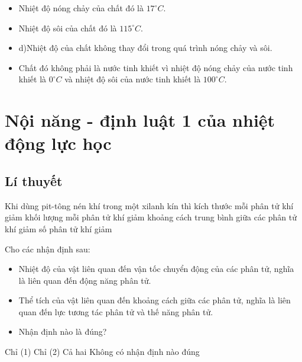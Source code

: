 \begin{ex}
{\begin{itemize}
			\item Nhiệt độ nóng chảy của chất đó là $17^{\circ} C$.
			\item Nhiệt độ sôi của chất đó là $115^{\circ} C$.
			\item d)Nhiệt độ của chất không thay đổi trong quá trình nóng chảy và sôi.
			\item Chất đó không phải là nước tinh khiết vì nhiệt độ nóng chảy của nước tinh khiết là $0^{\circ} C$ và nhiệt độ sôi của nước tinh khiết là $100^{\circ} C$.
		\end{itemize} 
	}
\end{ex}
\section{Nội năng - định luật 1 của nhiệt động lực học}
\subsection{Lí thuyết}


\begin{ex}
	Khi dùng pit-tông nén khí trong một xilanh kín thì
	\choice
	{kích thước mỗi phân tử khí giảm}
	{khối lượng mỗi phân tử khí giảm}
	{\True khoảng cách trung bình giữa các phân tử khí giảm}
	{số phân tử khí giảm}
	\end{ex}







\begin{ex}
	Cho các nhận định sau:
	\begin{itemize}
		\item[(1)] Nhiệt độ của vật liên quan đến vận tốc chuyển động của các phân tử, nghĩa là liên quan đến động năng phân tử.
		\item [(2)] Thể tích của vật liên quan đến khoảng cách giữa các phân tử, nghĩa là liên quan đến lực tương tác phân tử và thế năng phân tử.
		\item[] Nhận định nào là đúng?
	\end{itemize}
	\choice
	{Chỉ (1)}
	{Chỉ (2)}
	{\True Cả hai}
	{Không có nhận định nào đúng}
	\end{ex}



